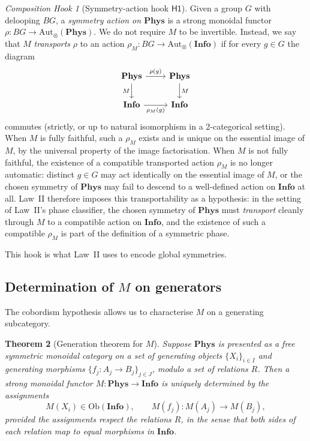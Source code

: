 \documentclass[12pt]{article}
\newtheorem{theorem}{Theorem}[section]
\theoremstyle{definition}
\theoremstyle{remark}
\newtheorem{hook}[theorem]{Composition Hook}
\newcommand{\Phys}{\mathbf{Phys}}
\newcommand{\Info}{\mathbf{Info}}
\newcommand{\Ob}{\mathrm{Ob}}
\begin{document}
\begin{hook}[Symmetry-action hook $\mathsf{H1}$]
\label{hook:H1}
Given a group $G$ with delooping $BG$, a \emph{symmetry action on $\Phys$} is a strong monoidal functor $\rho : BG \to \mathrm{Aut}_\otimes(\Phys)$. We do not require $M$ to be invertible. Instead, we say that $M$ \emph{transports} $\rho$ to an action $\rho_M : BG \to \mathrm{Aut}_\otimes(\Info)$ if for every $g \in G$ the diagram
\[
\begin{tikzcd}
\Phys \arrow[r, "\rho(g)"] \arrow[d, "M"'] & \Phys \arrow[d, "M"] \\
\Info \arrow[r, "\rho_M(g)"'] & \Info
\end{tikzcd}
\]
commutes (strictly, or up to natural isomorphism in a 2-categorical setting). When $M$ is fully faithful, such a $\rho_M$ exists and is unique on the essential image of $M$, by the universal property of the image factorisation. When $M$ is not fully faithful, the existence of a compatible transported action $\rho_M$ is no longer automatic: distinct $g \in G$ may act identically on the essential image of $M$, or the chosen symmetry of $\Phys$ may fail to descend to a well-defined action on $\Info$ at all. Law~II therefore imposes this transportability as a hypothesis: in the setting of Law~II's phase classifier, the chosen symmetry of $\Phys$ must \emph{transport} cleanly through $M$ to a compatible action on $\Info$, and the existence of such a compatible $\rho_M$ is part of the definition of a symmetric phase.
\end{hook}

This hook is what Law~II uses to encode global symmetries.

\subsection{Determination of \texorpdfstring{$M$}{M} on generators}

The cobordism hypothesis allows us to characterise $M$ on a generating subcategory.

\begin{theorem}[Generation theorem for $M$]
\label{thm:generation}
Suppose $\Phys$ is presented as a free symmetric monoidal category on a set of generating objects $\{X_i\}_{i \in I}$ and generating morphisms $\{f_j : A_j \to B_j\}_{j \in J}$, modulo a set of relations $R$. Then a strong monoidal functor $M : \Phys \to \Info$ is uniquely determined by the assignments
\[
M(X_i) \in \Ob(\Info),
\qquad
M(f_j) : M(A_j) \to M(B_j),
\]
provided the assignments respect the relations $R$, in the sense that both sides of each relation map to equal morphisms in $\Info$.
\end{theorem}
\end{document}
